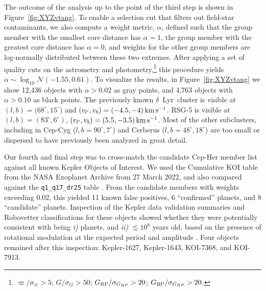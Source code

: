 \documentclass[12pt,twocolumn]{aastex63}
\newcommand{\mkms}{{\rm \,km\,s^{-1}}}  %
\begin{document}
The outcome of the analysis up to the point of the third step is shown
in Figure~\ref{fig:XYZvtang}.  To enable a selection cut that filters
out field-star contaminants, we also compute a weight metric,
$\alpha$, defined such that the group member with the smallest core
distance has $\alpha=1$, the group member with the greatest core
distance has $\alpha=0$, and weights for the other group members are
log-normally distributed between these two extremes.  After applying a
set of quality cuts on the astrometry and
photometry,\footnote{$\varpi/\sigma_\varpi>5$; $G/\sigma_{G}>50$;
$G_{\rm RP}/\sigma_{G_{RP}}>20$; $G_{\rm BP}/\sigma_{G_{BP}}>20$.}
this procedure yields $\alpha \sim \log_{10}\mathcal{N}(-1.55,0.61)$.
To visualize the results, in Figure~\ref{fig:XYZvtang} we show
12{,}436 objects with $\alpha>0.02$ as gray points, and 
4{,}763 objects with $\alpha>0.10$ as black points.  The previously
known $\delta$~Lyr\ cluster is visible at $(l,b)=(68^\circ,15^\circ$)
and $(v_{l'}, v_b)=(-4.5 ,-4 )\mkms$.  RSG-5 is visible at
$(l,b)=(83^\circ,6^\circ)$, $(v_{l'}, v_b)=(5.5 ,-3.5 )\mkms$.  Most
of the other subclusters, including in Cep-Cyg
($l,b=90^\circ,7^\circ$) and Cerberus ($l,b=48^\circ,18^\circ$) are
too small or dispersed to have previously been analyzed in great
detail.

%
%
Our fourth and final step was to cross-match the candidate Cep-Her
member list against all known Kepler Objects of Interest.  We used the
Cumulative KOI table from the NASA Exoplanet Archive from 27 March
2022, and also compared against the \texttt{q1\_q17\_dr25} table
\citep{thompson_planetary_2018}.  From the candidate members with
weights exceeding 0.02, this yielded 11 known false positives, 6
``confirmed'' planets, and 8 ``candidate'' planets.  Inspection of the
Kepler data validation summaries and Robovetter classifications for
these objects showed whether they were potentially consistent with
being {\it i)} planets, and {\it ii)} $\lesssim 10^8$ years old, based
on the presence of rotational modulation at the expected period and
amplitude \citep[{e.g.},][Figure~9]{rebull_rotation_2020}.  Four
objects remained after this inspection: Kepler-1627, Kepler-1643,
KOI-7368, and KOI-7913.
\end{document}
